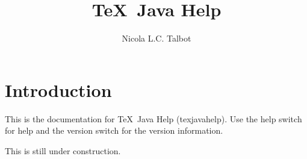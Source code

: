 \documentclass[toc=listof]{scrreport}
\title{\TeX\ Java Help}
\author{Nicola L.C. Talbot}
\begin{document}
\maketitle
\tableofcontents

\chapter{Introduction}
\label{sec:intro}

This is the documentation for \TeX\ Java Help (\gls{texjavahelp}).
Use the \gls{help} switch for help and the \gls{version} switch
for the version information.

This is still under construction.

\printunsrtglossary
\end{document}
